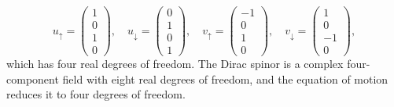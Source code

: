 \documentclass[11pt]{article}
\theoremstyle{definition}
\begin{document}
\begin{equation}
    u_\uparrow = 
    \begin{pmatrix}
        1\\0\\1\\0
    \end{pmatrix}, \quad
    u_\downarrow = 
    \begin{pmatrix}
        0\\1\\0\\1
    \end{pmatrix}, \quad
    v_\uparrow = 
    \begin{pmatrix}
        -1\\0\\1\\0
    \end{pmatrix}, \quad
    v_\downarrow = 
    \begin{pmatrix}
        1\\0\\-1\\0
    \end{pmatrix},
\end{equation}
which has four real degrees of freedom. The Dirac spinor is a complex four-component field with eight real degrees of freedom, and the equation of motion reduces it to four degrees of freedom.
\end{document}
